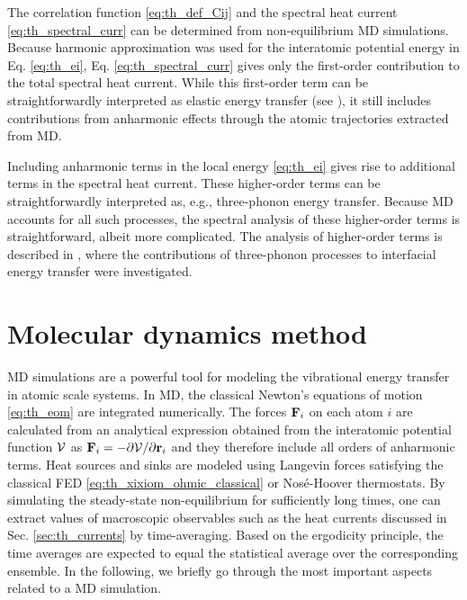 The correlation function \eqref{eq:th_def_Cij} and the spectral heat current \eqref{eq:th_spectral_curr} can be determined from non-equilibrium MD simulations. Because harmonic approximation was used for the interatomic potential energy in Eq. \eqref{eq:th_ei}, Eq. \eqref{eq:th_spectral_curr} gives only the first-order contribution to the total spectral heat current. While this first-order term can be straightforwardly interpreted as elastic energy transfer (see ), it still includes contributions from anharmonic effects through the atomic trajectories extracted from MD.

Including anharmonic terms in the local energy \eqref{eq:th_ei} gives rise to additional terms in the spectral heat current. These higher-order terms can be straightforwardly interpreted as, e.g., three-phonon energy transfer. Because MD accounts for all such processes, the spectral analysis of these higher-order terms is straightforward, albeit more complicated. The analysis of higher-order terms is described in , where the contributions of three-phonon processes to interfacial energy transfer were investigated. 

\section{Molecular dynamics method}

\label{sec:methods_md}

MD simulations are a powerful tool for modeling the vibrational energy transfer in atomic scale systems. In MD, the classical Newton's equations of motion \eqref{eq:th_eom} are integrated numerically. The forces $\mathbf{F}_i$ on each atom $i$ are calculated from an analytical expression obtained from the interatomic potential function $\mathcal{V}$ as $\mathbf{F}_i=-\partial \mathcal{V}/\partial \mathbf{r}_i$ and they therefore include all orders of anharmonic terms. Heat sources and sinks are modeled using Langevin forces satisfying the classical FED \eqref{eq:th_xixiom_ohmic_classical} or Nos\'e-Hoover \cite{nose84} thermostats. By simulating the steady-state non-equilibrium for sufficiently long times, one can extract values of macroscopic observables such as the heat currents discussed in Sec. \ref{sec:th_currents} by time-averaging. Based on the ergodicity principle, the time averages are expected to equal the statistical average over the corresponding ensemble. In the following, we briefly go through the most important aspects related to a MD simulation.

